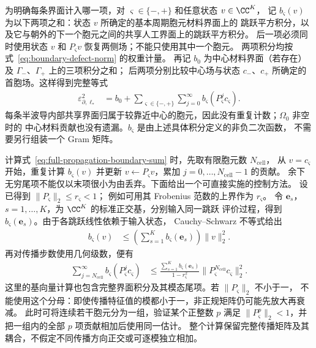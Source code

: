为明确每条界面计入哪一项，对 $\varsigma\in\{-,+\}$ 和任意状态 $v\in\CC^K$，
记 $b_\varsigma(v)$ 为以下两项之和：状态 $v$ 所确定的基本周期胞元材料界面上的
跳跃平方积分，以及它与朝外的下一个胞元之间的共享人工界面上的跳跃平方积分。
后一项必须同时使用状态 $v$ 和 $P_\varsigma v$ 恢复两侧场；不能只使用其中一个胞元。
两项积分均按式~\eqref{eq:boundary-defect-norm} 的权重计量。
再记 $b_0$ 为中心材料界面（若存在）及 $\Gamma_-$、$\Gamma_+$ 上的三项积分之和；
后两项分别比较中心场与状态 $c_-$、$c_+$ 所确定的首胞场。这样得到完整等式
\begin{align}
  \varepsilon_{\partial,\ell_*}^2
  &=b_0+\sum_{\varsigma\in\{-,+\}}\sum_{j=0}^{\infty}
    b_\varsigma(P_\varsigma^jc_\varsigma).
  \label{eq:full-propagation-boundary-sum}
\end{align}
每条半波导内部共享界面归属于较靠近中心的胞元，因此没有重复计数；$\Omega_0$ 非空时的
中心材料贡献也没有遗漏。$b_\varsigma$ 是由上述具体积分定义的非负二次函数，
不需要另行组装一个 Gram 矩阵。

计算式~\eqref{eq:full-propagation-boundary-sum} 时，先取有限胞元数 $N_{\mathrm{cell}}$，
从 $v=c_\varsigma$ 开始，重复计算 $b_\varsigma(v)$ 并更新
$v\leftarrow P_\varsigma v$，累加 $j=0,\ldots,N_{\mathrm{cell}}-1$ 的贡献。
余下无穷尾项不能仅以末项很小为由丢弃。下面给出一个可直接实施的控制方法。
设已得到 $\|P_\varsigma\|_2\leq r_\varsigma<1$；
例如可用其 Frobenius 范数的上界作为 $r_\varsigma$。
令 $\boldsymbol e_s$，$s=1,\ldots,K$，为 $\CC^K$ 的标准正交基，分别输入同一跳跃
评价过程，得到 $b_\varsigma(\boldsymbol e_s)$。由于各跳跃线性依赖于输入状态，
Cauchy--Schwarz 不等式给出
\begin{align*}
  b_\varsigma(v)
  &\leq\left(\sum_{s=1}^K b_\varsigma(\boldsymbol e_s)\right)\|v\|_2^2.
\end{align*}
再对传播步数使用几何级数，便有
\begin{align}
  \sum_{j=N_{\mathrm{cell}}}^{\infty}
    b_\varsigma(P_\varsigma^jc_\varsigma)
  &\leq
  \frac{\displaystyle\sum_{s=1}^K b_\varsigma(\boldsymbol e_s)}
       {1-r_\varsigma^2}
  \bigl\|P_\varsigma^{N_{\mathrm{cell}}}c_\varsigma\bigr\|_2^2.
  \label{eq:boundary-propagation-tail}
\end{align}
这里的基向量计算也包含完整界面积分及其模态尾项。若 $\|P_\varsigma\|_2$ 不小于一，
不能使用这个分母：即使传播特征值的模都小于一，非正规矩阵仍可能先放大再衰减。
此时可将连续若干胞元分为一组，验证某个正整数 $p$ 满足
$\|P_\varsigma^p\|_2<1$，并把一组内的全部 $p$ 项贡献相加后使用同一估计。
整个计算保留完整传播矩阵及其耦合，不假定不同传播方向正交或可逐模独立相加。

